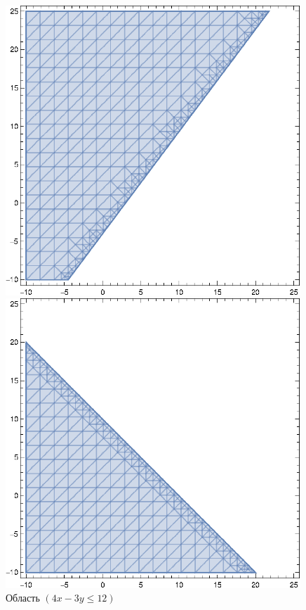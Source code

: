\begin{figure}[!htb]\centering
  \begin{minipage}{0.32\textwidth}
    \centering

    \includegraphics[width=0.99\textwidth]
    {inc/1.eps}
  
    \caption{Область $(4x-3y\leq 12)$}

    \label{fig:1}
  \end{minipage}
  \begin{minipage}{0.32\textwidth}
    \centering

    \includegraphics[width=0.99\textwidth]
    {inc/2.eps}
  

\end{minipage}
\end{figure}
